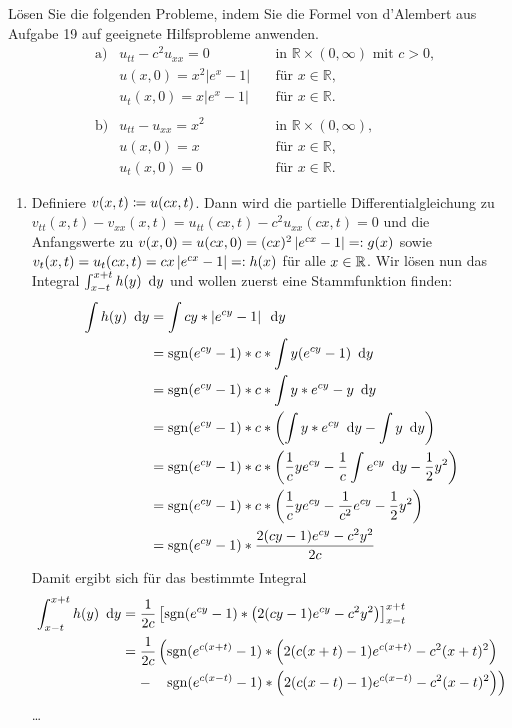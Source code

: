 \begin{exercisePage}
	
\begin{task}
	Lösen Sie die folgenden Probleme, indem Sie die Formel von d'Alembert aus Aufgabe 19 auf geeignete Hilfsprobleme anwenden.
	\begin{align*}
		&\text{a)}&
		u_{tt} - c^2u_{xx} = 0           &\quad  \text{in } \mathbb R \times (0,\infty) \text{ mit }c>0, \\
		&&u(x,0) 	           = x^2 |e^x-1| &\quad \text{für } x\in \mathbb R, \\
		&&u_t(x,0) 	   = x |e^x-1|   &\quad \text{für } x\in \mathbb R.\\
		&&&~\\
		&\text{b)}&
		u_{tt} - u_{xx} = x^2  &\quad \text{in } \mathbb R \times (0,\infty),\\
		&&u(x,0)          = x    &\quad \text{für } x\in \mathbb R, \\
		&&u_t(x,0)        = 0    &\quad \text{für } x\in \mathbb R.
	\end{align*}
\end{task}

\begin{enumerate}[label=(zu \alph*), leftmargin=*]
	\item Definiere $v(x,t) \coloneqq u(cx,t)$. Dann wird die partielle Differentialgleichung zu $v_{tt}(x,t) - v_{xx}(x,t) = u_{tt}(cx,t) - c^2 u_{xx}(cx,t) = 0$ und die Anfangswerte zu $v(x,0) = u(cx,0) = (cx)^2 \left| e^{cx} - 1 \right| \mathrel{=:} g(x)$ sowie $v_t(x,t) = u_t(cx,t) = cx \left| e^{cx} - 1 \right| \mathrel{=:} h(x)$ für alle $x \in \mathbb{R}$.
	Wir lösen nun das Integral $\int_{x-t}^{x+t} h(y) \enskip \mathrm{d}y$ und wollen zuerst eine Stammfunktion finden:
	\begin{align*}
		\int h(y) \enskip \mathrm{d}y 
		&= \int cy * \left| e^{cy} - 1 \right| \enskip \mathrm{d}y \\
		&= \operatorname{sgn}(e^{cy} - 1) * c * \int y (e^{cy} - 1) \enskip \mathrm{d}y \\
		&= \operatorname{sgn}(e^{cy} - 1) * c * \int y * e^{cy} - y \enskip \mathrm{d}y \\
		&= \operatorname{sgn}(e^{cy} - 1) * c * \left( \int y * e^{cy} \enskip \mathrm{d}y - \int y \enskip \mathrm{d}y \right) \\
		&= \operatorname{sgn}(e^{cy} - 1) * c * \left( \frac{1}{c} y e^{cy} - \frac{1}{c} \int e^{cy} \enskip \mathrm{d}y - \frac{1}{2} y^2 \right) \\
		&= \operatorname{sgn}(e^{cy} - 1) * c * \left( \frac{1}{c} y e^{cy} - \frac{1}{c^2} e^{cy} - \frac{1}{2} y^2 \right) \\
		&= \operatorname{sgn}(e^{cy} - 1) * \frac{2 (cy - 1) e^{cy} - c^2y^2}{2c}
	\end{align*}
	Damit ergibt sich für das bestimmte Integral
	\begin{align*}
		\int_{x-t}^{x+t} h(y) \enskip \mathrm{d}y
		&= \frac{1}{2c}\left[ \operatorname{sgn}(e^{cy} - 1) * \left( 2 (cy - 1) e^{cy} - c^2y^2 \right) \right]_{x-t}^{x+t} \\
		&= \frac{1}{2c} \left(\operatorname{sgn}(e^{c(x+t)} - 1) * \left( 2 (c(x+t) - 1) e^{c(x+t)} - c^2(x+t)^2 \right) \right. \\
		&\phantom{= } \ - \enskip \ \left. \operatorname{sgn}(e^{c(x-t)} - 1) * \left( 2 (c(x-t) - 1) e^{c(x-t)} - c^2(x-t)^2 \right)\right)
	\end{align*}
	\dots
	

\end{enumerate}
\end{exercisePage}
